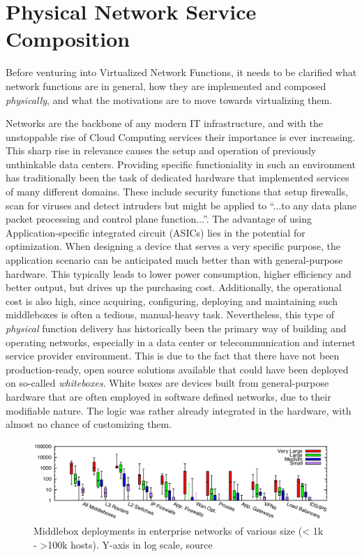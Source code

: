 \section{Physical Network Service Composition}
\label{sec:physical}
Before venturing into Virtualized Network Functions, it needs to be clarified what network functions are in general, how they are implemented and composed \textit{physically}, and what the motivations are to move towards virtualizing them. 

Networks are the backbone of any modern IT infrastructure, and with the unstoppable rise of  Cloud Computing services their importance is ever increasing. This sharp rise in relevance causes the setup and operation of previously unthinkable data centers. Providing specific functioniality in such an environment has traditionally been the task of dedicated hardware that implemented services of many different domains. These include security functions that setup firewalls, scan for viruses and detect intruders but might be applied to ``...to any data plane packet processing and control plane function...''\cite{nfv_wp}. The advantage of using Application-specific integrated circuit (ASICs) lies in the potential for optimization. When designing a device that serves a very specific purpose, the application scenario can be anticipated much better than with general-purpose hardware. This typically leads to lower power consumption, higher efficiency and better output, but drives up the purchasing cost. Additionally, the operational cost is also high, since acquiring, configuring, deploying and maintaining such middleboxes is often a tedious, manual-heavy task. Nevertheless, this type of \textit{physical} function delivery has historically been the primary way of building and operating networks, especially in a data center or telecommunication and internet service provider environment. This is due to the fact that there have not been production-ready, open source solutions available that could have been deployed on so-called \textit{whiteboxes}. White boxes are devices built from general-purpose hardware that are often employed in software defined networks, due to their modifiable nature. The logic was rather already integrated in the hardware, with almost no chance of customizing them.


\begin{figure}[h]
	\centering
	\includegraphics[width=1\linewidth]{images/middleboxesNumbers.png}
	\caption{Middlebox deployments in enterprise networks of various size (< 1k - >100k hosts). Y-axis in log scale, source \cite{sherry2016middleboxes}}
	\label{img:middleboxesNumbers}
\end{figure}

